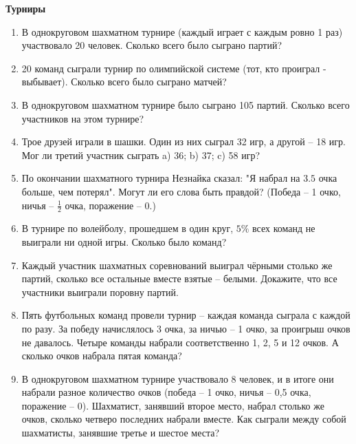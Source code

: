 \documentclass{article}
\begin{document}
\large
	
	
\begin{center}
	\textbf{Турниры}
\end{center}

\begin{enumerate}[label*=\protect\fbox{\arabic{enumi}}]
	
	\item В однокруговом шахматном турнире (каждый играет с каждым ровно 1 раз) участвовало 20 человек. Сколько всего было сыграно партий?
	
	\item 20 команд сыграли турнир по олимпийской системе (тот, кто проиграл - выбывает). Сколько всего было сыграно матчей?
	
	\item В однокруговом шахматном турнире было сыграно 105 партий. Сколько всего участников на этом турнире?
	
	\item Трое друзей играли в шашки. Один из них сыграл 32 игр, а другой – 18 игр. Мог ли третий участник сыграть a) 36; b) 37; c) 58 игр?
	
	\item По окончании шахматного турнира Незнайка сказал: "Я набрал на $3.5$ очка больше, чем потерял". Могут ли его слова быть правдой?
	(Победа – 1 очко, ничья – $\frac{1}{2}$ очка, поражение – 0.)
	
	\item В турнире по волейболу, прошедшем в один круг, $5\%$ всех команд не выиграли ни одной игры. Сколько было команд?
	
	\item Каждый участник шахматных соревнований выиграл чёрными столько же партий, сколько все остальные вместе взятые – белыми.
	Докажите, что все участники выиграли поровну партий.
	
	\item  Пять футбольных команд провели турнир – каждая команда сыграла с каждой по разу. За победу начислялось 3 очка, за ничью – 1 очко, за проигрыш очков не давалось. Четыре команды набрали соответственно 1, 2, 5 и 12 очков. А сколько очков набрала пятая команда?
	
	\item В однокруговом шахматном турнире участвовало 8 человек, и в итоге они набрали разное количество очков (победа – 1 очко, ничья – 0,5 очка, поражение – 0). Шахматист, занявший второе место, набрал столько же очков, сколько четверо последних набрали вместе.
	Как сыграли между собой шахматисты, занявшие третье и шестое места?
	

\end{enumerate}
\end{document}
